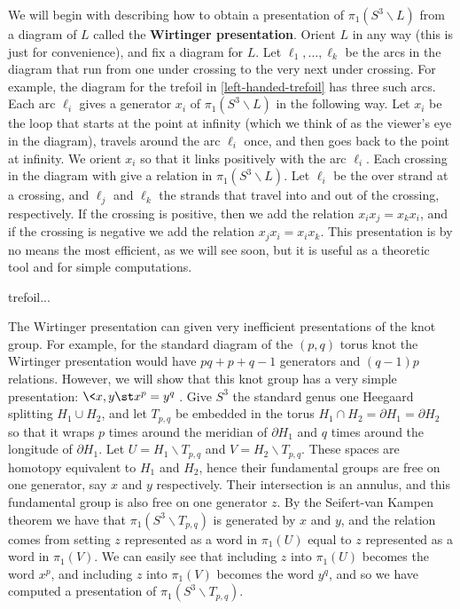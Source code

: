 We will begin with describing how to obtain a presentation of $\pi_1(S^3 \backslash L)$ from a diagram of $L$ called the \textbf{Wirtinger presentation}. Orient $L$ in any way (this is just for convenience), and fix a diagram for $L$. Let $\ell_1,\ldots,\ell_k$ be the arcs in the diagram that run from one under crossing to the very next under crossing. For example, the diagram for the trefoil in \cref{left-handed-trefoil} has three such arcs. Each arc $\ell_i$ gives a generator $x_i$ of $\pi_1(S^3 \backslash L)$ in the following way. Let $x_i$ be the loop that starts at the point at infinity (which we think of as the viewer's eye in the diagram), travels around the arc $\ell_i$ once, and then goes back to the point at infinity. We orient $x_i$ so that it links positively with the arc $\ell_i$. Each crossing in the diagram with give a relation in $\pi_1(S^3 \backslash L)$. Let $\ell_i$ be the over strand at a crossing, and $\ell_j$ and $\ell_k$ the strands that travel into and out of the crossing, respectively. If the crossing is positive, then we add the relation $x_ix_j=x_kx_i$, and if the crossing is negative we add the relation $x_jx_i=x_ix_k$. This presentation is by no means the most efficient, as we will see soon, but it is useful as a theoretic tool and for simple computations.


\begin{example}
trefoil...
\end{example}

\begin{example}
The Wirtinger presentation can given very inefficient presentations of the knot group. For example, for the standard diagram of the $(p,q)$ torus knot the Wirtinger presentation would have $pq+p+q-1$ generators and $(q-1)p$ relations. However, we will show that this knot group has a very simple presentation: $\< x,y \st x^p=y^q \>$. Give $S^3$ the standard genus one Heegaard splitting $H_1 \cup H_2$, and let $T_{p,q}$ be embedded in the torus $H_1 \cap H_2 = \partial H_1 = \partial H_2$ so that it wraps $p$ times around the meridian of $\partial H_1$ and $q$ times around the longitude of $\partial H_1$. Let $U = H_1 \backslash T_{p,q}$ and $V = H_2 \backslash T_{p,q}$. These spaces are homotopy equivalent to $H_1$ and $H_2$, hence their fundamental groups are free on one generator, say $x$ and $y$ respectively. Their intersection is an annulus, and this fundamental group is also free on one generator $z$. By the Seifert-van Kampen theorem we have that $\pi_1(S^3 \backslash T_{p,q})$ is generated by $x$ and $y$, and the relation comes from setting $z$ represented as a word in $\pi_1(U)$ equal to $z$ represented as a word in $\pi_1(V)$. We can easily see that including $z$ into $\pi_1(U)$ becomes the word $x^p$, and including $z$ into $\pi_1(V)$ becomes the word $y^q$, and so we have computed a presentation of $\pi_1(S^3 \backslash T_{p,q})$. 
\end{example}


